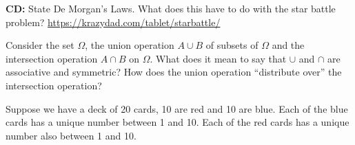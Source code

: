 \documentclass[addpoints,12pt]{exam}
\begin{document}
\begin{questions}
\addpoints

\question[2] \textbf{CD:} State De Morgan's Laws. What does this have to do with the star battle problem? \url{https://krazydad.com/tablet/starbattle/}


\question[2] Consider the set $\Omega$, the union operation $A \cup B$ of subsets of $\Omega$ and the intersection operation $A \cap B$ on $\Omega$. What does it mean to say that $\cup$ and $\cap$ are associative and symmetric? How does the union operation ``distribute over'' the intersection operation?


\question[5] Suppose we have a deck of 20 cards, 10 are red and 10 are blue. Each of the blue cards has a unique number between 1 and 10. Each of the red cards has a unique number also between 1 and 10.

\noaddpoints
{}
\end{questions}
\end{document}
